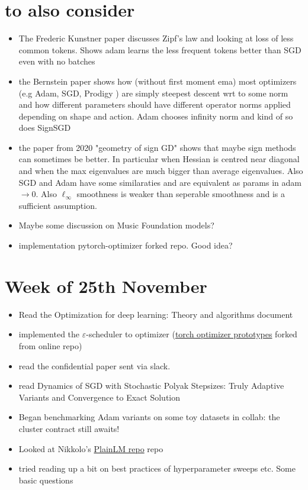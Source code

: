 \documentclass[12pt]{article}
\begin{document}
\section*{to also consider}
\begin{itemize}
\item The Frederic Kunstner paper discusses Zipf's law and looking at loss of less common tokens. Shows adam learns the less frequent tokens better than SGD even with no batches
\item the Bernstein paper shows how (without first moment ema) most optimizers (e.g Adam, SGD, Prodigy ) are simply steepest descent wrt to some norm and how different parameters should have different operator norms applied depending on shape and action. Adam chooses infinity norm and kind of so does SignSGD
\item the paper from 2020 "geometry of sign GD" shows that maybe sign methods can sometimes be better. In particular when Hessian is centred near diagonal and when the max eigenvalues are much bigger than average eigenvalues. Also SGD and Adam have some similaraties and are equivalent as params in adam $\to 0$.  Also $\ell_{\infty}$ smoothness is weaker than seperable smoothness and is a  sufficient assumption. 
\item Maybe some discussion on Music Foundation models?  
\item implementation pytorch-optimizer forked repo. Good idea? 
\end{itemize}



\section*{Week of 25th November}
\begin{itemize}
\item Read the Optimization for deep learning: Theory and algorithms document
\item implemented the $\varepsilon $-scheduler to optimizer (\href{https://github.com/sam-laing/torch_optimizer_prototypes}{torch optimizer prototypes} forked from online repo)
\item read the confidential paper sent via slack. 
\item read Dynamics of SGD with Stochastic Polyak Stepsizes:
Truly Adaptive Variants and Convergence
to Exact Solution
\item Began benchmarking Adam variants on some toy datasets in collab: the cluster contract still awaits!

\item Looked at Nikkolo's \href{https://github.com/Niccolo-Ajroldi/plainLM/tree/main}{PlainLM repo} repo
\item tried reading up a bit on best practices of hyperparameter sweeps etc. Some basic questions 
\end{itemize}
\end{document}
